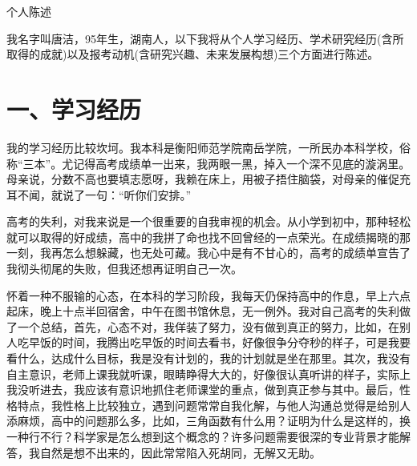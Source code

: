 \documentclass[cs5size]{article}
\newcommand{\wuhao}{\fontsize{10.5pt}{\baselineskip}\selectfont}
\renewcommand{\thefootnote}{\fnsymbol{footnote}}
\begin{document}
\wuhao
\setcounter{page}{1} %
\begin{center}
{{\LARGE\heiti 个人陈述}\\[0.6cm]}
\end{center}


我名字叫唐洁，95年生，湖南人，以下我将从个人学习经历、学术研究经历(含所取得的成就)以及报考动机(含研究兴趣、未来发展构想)三个方面进行陈述。

\section*{一、学习经历}

我的学习经历比较坎坷。我本科是衡阳师范学院南岳学院，一所民办本科学校，俗称“三本”。尤记得高考成绩单一出来，我两眼一黑，掉入一个深不见底的漩涡里。母亲说，分数不高也要填志愿呀，我赖在床上，用被子捂住脑袋，对母亲的催促充耳不闻，就说了一句：“听你们安排。”

高考的失利，对我来说是一个很重要的自我审视的机会。从小学到初中，那种轻松就可以取得的好成绩，高中的我拼了命也找不回曾经的一点荣光。在成绩揭晓的那一刻，我再怎么想躲藏，也无处可藏。我心中是有不甘心的，高考的成绩单宣告了我彻头彻尾的失败，但我还想再证明自己一次。

怀着一种不服输的心态，在本科的学习阶段，我每天仍保持高中的作息，早上六点起床，晚上十点半回宿舍，中午在图书馆休息，无一例外。我对自己高考的失利做了一个总结，首先，心态不对，我佯装了努力，没有做到真正的努力，比如，在别人吃早饭的时间，我腾出吃早饭的时间去看书，好像很争分夺秒的样子，可是我要看什么，达成什么目标，我是没有计划的，我的计划就是坐在那里。其次，我没有自主意识，老师上课我就听课，眼睛睁得大大的，好像很认真听讲的样子，实际上我没听进去，我应该有意识地抓住老师课堂的重点，做到真正参与其中。最后，性格特点，我性格上比较独立，遇到问题常常自我化解，与他人沟通总觉得是给别人添麻烦，高中的问题那么多，比如，三角函数有什么用？证明为什么是这样的，换一种行不行？科学家是怎么想到这个概念的？许多问题需要很深的专业背景才能解答，我自然是想不出来的，因此常常陷入死胡同，无解又无助。
\end{document}

